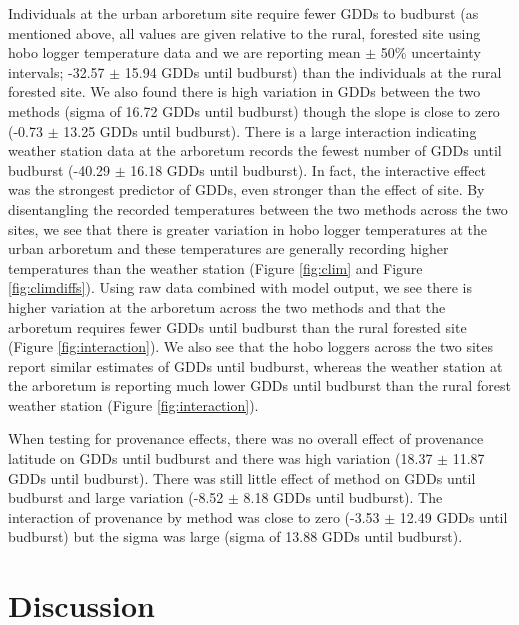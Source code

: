 \documentclass{article}\usepackage[]{graphicx}\usepackage[]{color}
\begin{document}
Individuals at the urban arboretum site require fewer GDDs to budburst (as mentioned above, all values are given relative to the rural, forested site using hobo logger temperature data and we are reporting mean $\pm$ 50\% uncertainty intervals; -32.57 $\pm$ 15.94 GDDs until budburst) than the individuals at the rural forested site. We also found there is high variation in GDDs between the two methods (sigma of 16.72 GDDs until budburst) though the slope is close to zero (-0.73 $\pm$ 13.25 GDDs until budburst). There is a large interaction indicating weather station data at the arboretum records the fewest number of GDDs until budburst (-40.29 $\pm$ 16.18 GDDs until budburst). In fact, the interactive effect was the strongest predictor of GDDs, even stronger than the effect of site. By disentangling the recorded temperatures between the two methods across the two sites, we see that there is greater variation in hobo logger temperatures at the urban arboretum and these temperatures are generally recording higher temperatures than the weather station (Figure \ref{fig:clim} and Figure \ref{fig:climdiffs}). Using raw data combined with model output, we see there is higher variation at the arboretum across the two methods and that the arboretum requires fewer GDDs until budburst than the rural forested site (Figure \ref{fig:interaction}). We also see that the hobo loggers across the two sites report similar estimates of GDDs until budburst, whereas the weather station at the arboretum is reporting much lower GDDs until budburst than the rural forest weather station (Figure \ref{fig:interaction}). 

When testing for provenance effects, there was no overall effect of provenance latitude on GDDs until budburst and there was high variation (18.37 $\pm$ 11.87 GDDs until budburst). There was still little effect of method on GDDs until budburst and large variation (-8.52 $\pm$ 8.18 GDDs until budburst). The interaction of provenance by method was close to zero (-3.53 $\pm$ 12.49 GDDs until budburst) but the sigma was large (sigma of 13.88 GDDs until budburst).

\section*{Discussion} 
\end{document}
